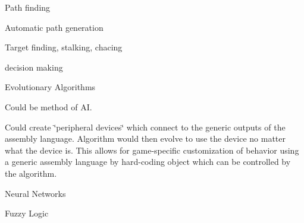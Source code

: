 
\begin{DoxyItemize}
\item Path finding
\item Automatic path generation
\item Target finding, stalking, chacing
\item decision making
\item Evolutionary Algorithms
\begin{DoxyItemize}
\item Could be method of AI.
\item Could create \char`\"{}peripheral devices\char`\"{} which connect to the generic outputs of the assembly language. Algorithm would then evolve to use the device no matter what the device is. This allows for game-\/specific customization of behavior using a generic assembly language by hard-\/coding object which can be controlled by the algorithm.
\end{DoxyItemize}
\item Neural Networks
\item Fuzzy Logic 
\end{DoxyItemize}
